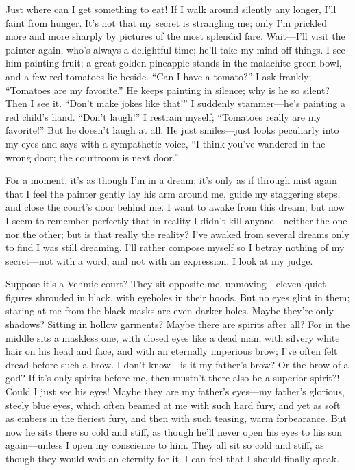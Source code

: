 \documentclass[12pt,a4paper]{article}
\begin{document}
Just where can I get something to eat! If I walk around silently any longer, I’ll faint from hunger. It’s not that my secret is strangling me; only I’m prickled more and more sharply by pictures of the most splendid fare. Wait—I’ll visit the painter again, who’s always a delightful time; he’ll take my mind off things. I see him painting fruit; a great golden pineapple stands in the malachite-green bowl, and a few red tomatoes lie beside. “Can I have a tomato?” I ask frankly; “Tomatoes are my favorite.” He keeps painting in silence; why is he so silent? Then I see it. “Don’t make jokes like that!” I suddenly stammer—he’s painting a red child’s hand. “Don’t laugh!” I restrain myself; “Tomatoes really are my favorite!” But he doesn’t laugh at all. He just smiles—just looks peculiarly into my eyes and says with a sympathetic voice, “I think you’ve wandered in the wrong door; the courtroom is next door.”

For a moment, it’s as though I’m in a dream; it’s only as if through mist again that I feel the painter gently lay his arm around me, guide my staggering steps, and close the court’s door behind me. I want to awake from this dream; but now I seem to remember perfectly that in reality I didn’t kill anyone—neither the one nor the other; but is that really the reality? I’ve awaked from several dreams only to find I was still dreaming. I’ll rather compose myself so I betray nothing of my secret—not with a word, and not with an expression. I look at my judge.

Suppose it’s a Vehmic court? They sit opposite me, unmoving—eleven quiet figures shrouded in black, with eyeholes in their hoods. But no eyes glint in them; staring at me from the black masks are even darker holes. Maybe they’re only shadows? Sitting in hollow garments? Maybe there are spirits after all? For in the middle sits a maskless one, with closed eyes like a dead man, with silvery white hair on his head and face, and with an eternally imperious brow; I’ve often felt dread before such a brow. I don’t know—is it my father’s brow? Or the brow of a god? If it’s only spirits before me, then mustn’t there also be a superior spirit?! Could I just see his eyes! Maybe they are my father’s eyes—my father’s glorious, steely blue eyes, which often beamed at me with such hard fury, and yet as soft as embers in the fieriest fury, and then with such teasing, warm forbearance. But now he sits there so cold and stiff, as though he’ll never open his eyes to his son again—unless I open my conscience to him. They all sit so cold and stiff, as though they would wait an eternity for it. I can feel that I should finally speak.
\end{document}
